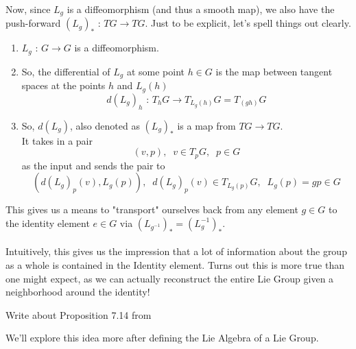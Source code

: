 \documentclass[11pt]{article}
\begin{document}
\vskip 0.5cm
Now, since $L_g$ is a diffeomorphism (and thus a smooth map), we also have the push-forward $(L_g)_* \text{ : } TG \rightarrow TG$. Just to be explicit, let's spell things out clearly. 
\begin{dottedbox}
  \begin{enumerate}[label=(\alph*)]
    \item $L_g \text{ : } G \rightarrow G$ is a diffeomorphism.
    \item So, the differential of $L_g$ at some point $h \in G$ is the map between tangent spaces at the points $h$ and $L_g(h)$ \[d\left(L_g\right)_h \text{ : } T_h G \rightarrow T_{L_g(h)} G = T_{(gh)} G\]
    \item So, $d\left(L_g\right)$, also denoted as $\left(L_g\right)_*$ is a map from $TG \rightarrow TG$. \\
    It takes in a pair \[(v, p), \;\; v \in T_p G, \;\; p \in G \] as the input and sends the pair to \[ \left( d(L_g)_p(v), L_g(p)\right), \;\; d(L_g)_p(v) \in T_{{L_g}(p)} G, \;\; L_g(p) = gp \in G \]
  \end{enumerate}
\end{dottedbox}

This gives us a means to "transport" ourselves back from any element $g \in G$ to the identity element $e \in G$ via $(L_{g^{-1}})_* = \left(L_g^{-1}\right)_*$. 
\\
\\
Intuitively, this gives us the impression that a lot of information about the group as a whole is contained in the Identity element. Turns out this is more true than one might expect, as we can actually reconstruct the entire Lie Group given a neighborhood around the identity!
\begin{note}
  {Write about Proposition 7.14 from \cite{LeeSM}}
\end{note}
We'll explore this idea more after defining the Lie Algebra of a Lie Group.
\\
\end{document}
